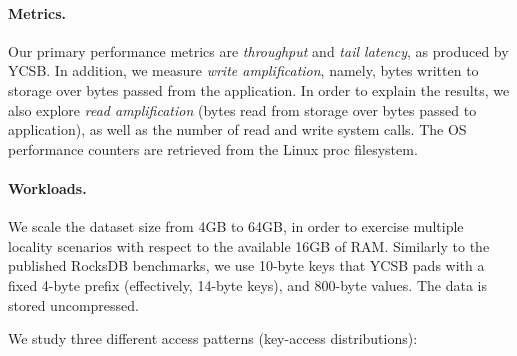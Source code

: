 \paragraph{Metrics.} Our primary performance metrics are \emph{throughput} and \emph{tail latency}, as produced by YCSB. 
In addition, we measure \emph{write amplification}, namely, bytes written to storage over bytes passed from the application. 
In order to explain the results, we also explore \emph{read amplification} (bytes read from storage over bytes passed to application), 
as well as the number of read and write system calls. The OS performance counters are retrieved from the Linux
proc filesystem. 

\paragraph{Workloads.} 
We scale the dataset size from 4GB to 64GB, in order to exercise multiple locality 
scenarios with respect to the available 16GB of RAM. Similarly to the published RocksDB benchmarks, we use 
10-byte keys that YCSB pads with a fixed 4-byte prefix (effectively, 14-byte keys), and 800-byte values. 
The data is stored uncompressed. 

We study three different access patterns (key-access distributions):  

